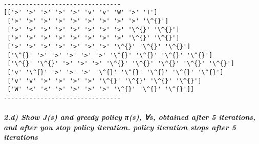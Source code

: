 \documentclass[11pt]{article}
\begin{document}
    \begin{center}
    \end{center}
    { \hspace*{\fill} \\}
    
    \begin{Verbatim}[commandchars=\\\{\}]
--------------------------------
[['>' '>' '>' '>' '>' 'v' 'v' 'W' '>' 'T']
 ['>' '>' '>' '>' '>' '>' '>' '>' '>' '\^{}']
 ['>' '>' '>' '>' '>' '>' '>' '>' '\^{}' '\^{}']
 ['>' '>' '>' '>' '>' '>' '>' '>' '\^{}' '\^{}']
 ['>' '>' '>' '>' '>' '>' '>' '\^{}' '\^{}' '\^{}']
 ['\^{}' '>' '>' '>' '>' '>' '\^{}' '\^{}' '\^{}' '\^{}']
 ['\^{}' '\^{}' '>' '>' '>' '\^{}' '\^{}' '\^{}' '\^{}' '\^{}']
 ['v' '\^{}' '>' '>' '>' '\^{}' '\^{}' '\^{}' '\^{}' '\^{}']
 ['v' 'v' '>' '>' '>' '>' '\^{}' '\^{}' '\^{}' '\^{}']
 ['W' '<' '<' '>' '>' '>' '>' '\^{}' '\^{}' '\^{}']]
--------------------------------

    \end{Verbatim}

    \subparagraph{2.d) Show J(s) and greedy policy π(s), ∀s, obtained after
5 iterations, and after you stop policy iteration. policy iteration
stops after 5
iterations}\label{d-show-js-and-greedy-policy-ux3c0s-s-obtained-after-5-iterations-and-after-you-stop-policy-iteration.-policy-iteration-stops-after-5-iterations}
\end{document}
